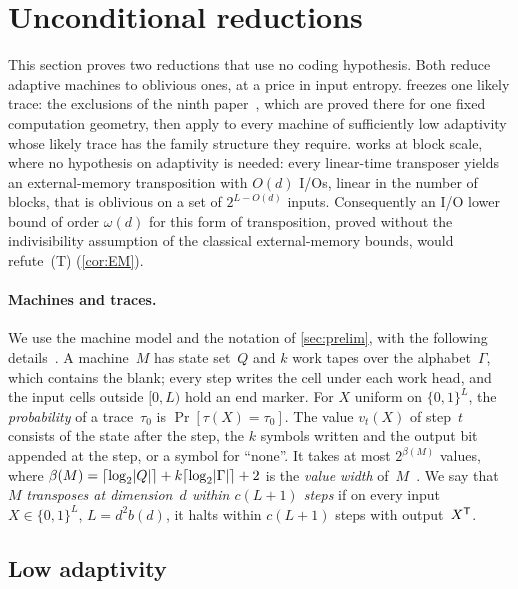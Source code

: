 \section{Unconditional reductions}\label{sec:reductions}

This section proves two reductions that use no coding hypothesis. Both reduce adaptive machines to oblivious ones, at a
price in input entropy.  freezes one likely trace: the exclusions of the ninth
paper~\cite{SourceCovers2026}, which are proved there for one fixed computation geometry, then apply to every machine of
sufficiently low adaptivity whose likely trace has the family structure they require.  works at block
scale, where no hypothesis on adaptivity is needed: every linear-time transposer yields an external-memory transposition
with $O(d)$ I/Os, linear in the number of blocks, that is oblivious on a set of $2^{L-O(d)}$ inputs. Consequently an
I/O lower bound of order $\omega(d)$ for this form of transposition, proved without the indivisibility assumption of the
classical external-memory bounds, would refute~(T) (\cref{cor:EM}).

\paragraph{Machines and traces.} We use the machine model and the notation of \cref{sec:prelim}, with the following
details~\cite[Section~2.1]{BoundedNesting2026}. A machine~$M$ has state set~$Q$ and $k$ work tapes over the
alphabet~$\Gamma$, which contains the blank; every step writes the cell under each work head, and the input cells outside
$[0,L)$ hold an end marker. For $X$ uniform on $\{0,1\}^L$, the \emph{probability} of a trace~$\tau_0$ is
$\Pr[\tau(X)=\tau_0]$. The value $v_t(X)$ of step~$t$ consists of the state after the step, the $k$ symbols written and
the output bit appended at the step, or a symbol for ``none''. It takes at most $2^{\beta(M)}$ values, where
$\beta(M)=\lceil\log_2\lvert Q \rvert\rceil+k\lceil\log_2\lvert \Gamma \rvert\rceil+2$ is the \emph{value width} of~$M$~\cite[Section~4.1]{FourthPaper2026}.
We say that $M$ \emph{transposes at dimension~$d$ within $c(L+1)$ steps} if on every input $X\in\{0,1\}^L$, $L=d^2b(d)$,
it halts within $c(L+1)$ steps with output~$X^{\mathsf{T}}$.

\subsection{Low adaptivity}\label{sec:reductions-LA}


